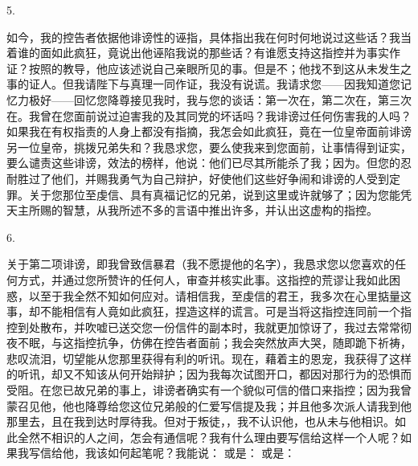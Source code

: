 5. \par

如今，我的控告者依据他诽谤性的诬指，具体指出我在何时何地说过这些话？我当着谁的面如此疯狂，竟说出他诬陷我说的那些话？有谁愿支持这指控并为事实作证？按照的教导，他应该述说自己亲眼所见的事。但是不；他找不到这从未发生之事的证人。但我请陛下与真理一同作证，我没有说谎。我请求您——因我知道您记忆力极好——回忆您降尊接见我时，我与您的谈话：第一次在，第二次在，第三次在。我曾在您面前说过迫害我的及其同党的坏话吗？我诽谤过任何伤害我的人吗？如果我在有权指责的人身上都没有指摘，我怎会如此疯狂，竟在一位皇帝面前诽谤另一位皇帝，挑拨兄弟失和？我恳求您，要么使我来到您面前，让事情得到证实，要么谴责这些诽谤，效法的榜样，他说：他们已尽其所能杀了我；因为。但您的忍耐胜过了他们，并赐我勇气为自己辩护，好使他们这些好争闹和诽谤的人受到定罪。关于您那位至虔信、具有真福记忆的兄弟，说到这里或许就够了；因为您能凭天主所赐的智慧，从我所述不多的言语中推出许多，并认出这虚构的指控。\par

6. \par

关于第二项诽谤，即我曾致信暴君（我不愿提他的名字），我恳求您以您喜欢的任何方式，并通过您所赞许的任何人，审查并核实此事。这指控的荒谬让我如此困惑，以至于我全然不知如何应对。请相信我，至虔信的君王，我多次在心里掂量这事，却不能相信有人竟如此疯狂，捏造这样的谎言。可是当将这指控连同前一个指控到处散布，并吹嘘已送交您一份信件的副本时，我就更加惊讶了，我过去常常彻夜不眠，与这指控抗争，仿佛在控告者面前；我会突然放声大哭，随即跪下祈祷，悲叹流泪，切望能从您那里获得有利的听讯。现在，藉着主的恩宠，我获得了这样的听讯，却又不知该从何开始辩护；因为我每次试图开口，都因对那行为的恐惧而受阻。在您已故兄弟的事上，诽谤者确实有一个貌似可信的借口来指控；因为我曾蒙召见他，他也降尊给您这位兄弟般的仁爱写信提及我；并且他多次派人请我到他那里去，且在我到达时厚待我。但对于叛徒，，我不认识他，也从未与他相识。如此全然不相识的人之间，怎会有通信呢？我有什么理由要写信给这样一个人呢？如果我写信给他，我该如何起笔呢？我能说： 或是： 或是：\par

